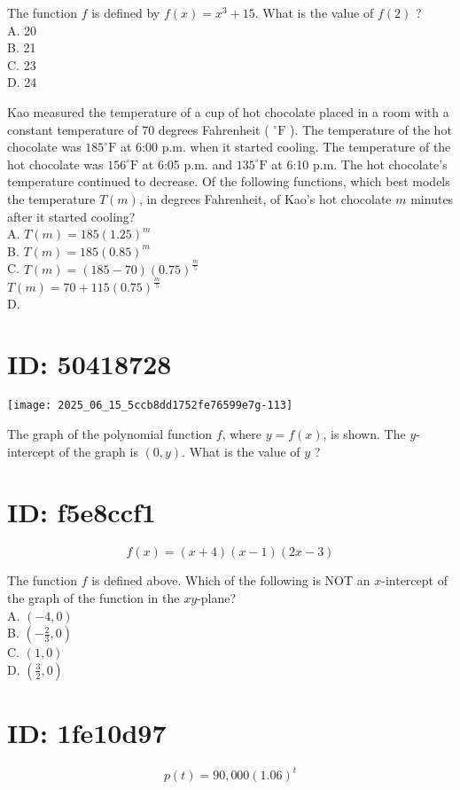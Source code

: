 The function $f$ is defined by $f(x)=x^{3}+15$. What is the value of $f(2)$ ?\\
A. 20\\
B. 21\\
C. 23\\
D. 24

Kao measured the temperature of a cup of hot chocolate placed in a room with a constant temperature of 70 degrees Fahrenheit ( ${ }^{\circ} \mathrm{F}$ ). The temperature of the hot chocolate was $185^{\circ} \mathrm{F}$ at 6:00 p.m. when it started cooling. The temperature of the hot chocolate was $156^{\circ} \mathrm{F}$ at 6:05 p.m. and $135^{\circ} \mathrm{F}$ at 6:10 p.m. The hot chocolate's temperature continued to decrease. Of the following functions, which best models the temperature $T(m)$, in degrees Fahrenheit, of Kao's hot chocolate $m$ minutes after it started cooling?\\
A. $T(m)=185(1.25)^{m}$\\
B. $T(m)=185(0.85)^{m}$\\
C. $T(m)=(185-70)(0.75)^{\frac{m}{5}}$\\
$T(m)=70+115(0.75)^{\frac{m}{5}}$\\
D.

\section*{ID: 50418728}
\begin{center}
\texttt{[image: 2025\_06\_15\_5ccb8dd1752fe76599e7g-113]}
\end{center}

The graph of the polynomial function $f$, where $y=f(x)$, is shown. The $y$-intercept of the graph is $(0, y)$. What is the value of $y$ ?

\section*{ID: f5e8ccf1}
$$
f(x)=(x+4)(x-1)(2 x-3)
$$

The function $f$ is defined above. Which of the following is NOT an $x$-intercept of the graph of the function in the $x y$-plane?\\
A. $(-4,0)$\\
B. $\left(-\frac{2}{3}, 0\right)$\\
C. $(1,0)$\\
D. $\left(\frac{3}{2}, 0\right)$

\section*{ID: 1fe10d97}
$$
p(t)=90,000(1.06)^{t}
$$

